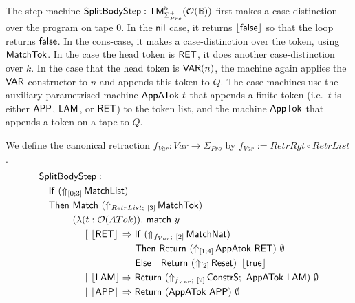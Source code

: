 The step machine $\mathsf{SplitBodyStep} : \mathsf{TM}_{\Sigma^+_{Pro}}^5(\mathcal{O}(\mathbb{B}))$ first makes a case-distinction over the program on tape $0$.  In the
$\mathsf{nil}$ case, it returns $\left\lfloor {\ensuremath{\mathsf{false}}} \right\rfloor$ so that the loop returns $\mathsf{false}$.  In the cons-case, it makes a case-distinction over the token, using
$\mathsf{MatchTok}$.  In the case the head token is $\mathsf{RET}$, it does another case-distinction over $k$.  In the case that the head token is
$\mathsf{VAR}(n)$, the machine again applies the $\mathsf{VAR}$ constructor to $n$ and appends this token to $Q$.  The case-machines use the auxiliary
parametrised machine $\mathsf{AppATok}~t$ that appends a finite token (i.e.\ $t$ is either $\mathsf{APP}$, $\mathsf{LAM}$, or $\mathsf{RET}$) to the token list, and
the machine $\mathsf{AppTok}$ that appends a token on a tape to $Q$.


\begin{definition}
  \label{def:JumpTarget}
  We define the canonical retraction $f_{Var} : Var \to \Sigma_{Pro}$ by $f_{Var} := RetrRgt \circ RetrList$.
  \begin{alignat*}{1}
    & \MS{SplitBodyStep} := \\
    & \quad \MS{If}~(\LiftTapes{\MS{MatchList}}{\Vector{0;3}}) \\
    & \quad \MS{Then}~\Match~(\LiftBoth{\MS{MatchTok}}{RetrList}{\Vector{3}}) \\
    & \quad \phantom{\MS{Then}}~(\lambda (t : \Option(ATok)).~\MS{match}~y\\
    & \quad \phantom{\MS{Then}~(\lambda}~[~ \phalign{\Some{\MS{LAM}}}{\Some{\MS{RET}}} \Rightarrow \MS{If}~(\LiftBoth{\MS{MatchNat}}{f_{Var}}{\Vector{2}}) \\
    & \quad \phantom{\MS{Then}~(\lambda~[~ \Some{\MS{LAM} \Rightarrow}}~\MS{Then}~ \Return{(\LiftTapes{\MS{AppAtok~\MS{RET}}}{\Vector{1;4}})}{\None} \\
    & \quad \phantom{\MS{Then}~(\lambda~[~ \Some{\MS{LAM} \Rightarrow}}~\MS{Else}~~~ \Return{(\LiftTapes{\MS{Reset}}{\Vector{2}})}{\Some\true} \\
    & \quad \phantom{\MS{Then}~(\lambda}~|~ \phalign{\Some{\MS{LAM}}}{\Some{\MS{LAM}}} \Rightarrow \Return{(\LiftBoth{\MS{ConstrS}}{f_{Var}}{\Vector{2}} \Seq \MS{AppATok}~\MS{LAM})}{\None} \\
    & \quad \phantom{\MS{Then}~(\lambda}~|~ \phalign{\Some{\MS{LAM}}}{\Some{\MS{APP}}} \Rightarrow \Return{(\MS{AppATok}~\MS{APP})}{\None} \\

\end{alignat*}
\end{definition}
